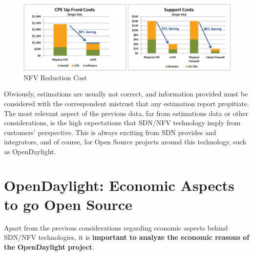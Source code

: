 \documentclass[a4paper, 12pt]{book}
\begin{document}
\begin{center}
 \begin{figure}
 \begin{center}
   \includegraphics[width=15cm]{img/nfv-cost-savings-00.png}
   \caption{NFV Reduction Cost}
   \label{fig:sdnopexreduction}
 \end{center}
 \end{figure}
\end{center}
Obviously, estimations are usually not correct, and information provided must be considered with the correspondent mistrust that any estimation report propitiate. The most relevant aspect of the previous data, far from estimations data or other considerations, is the high expectations that SDN/NFV technology imply from customers' perspective. This is always exciting from SDN provides and integrators, and of course, for Open Source projects around this technology, such as OpenDaylight.

\section{OpenDaylight: Economic Aspects to go Open Source}
\label{sec:odlopensource}
Apart from the previous considerations regarding economic aspects behind SDN/NFV technologies, it is \textbf{important to analyze the economic reasons of the OpenDaylight project}.
\end{document}
